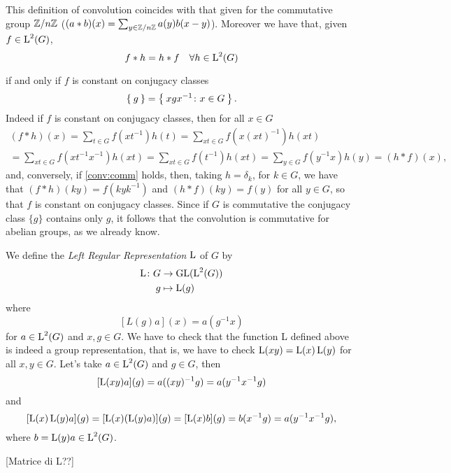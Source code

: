 \begin{rem}
This definition of convolution coincides with that given for the commutative group ${\mathbb Z}/{n{\mathbb Z}}$ ($(a\ast b)(x)=\sum_{y \in {\mathbb Z}/{n{\mathbb Z}}} a(y)b(x-y)$). 
Moreover we have that, given $f\in \operatorname{L}^2(G)$,
\begin{equation}
\label{conv:comm}
f*h=h*f \quad \forall h \in \operatorname{L}^2(G)
\end{equation}

if and only if $f$ is constant on conjugacy classes
\[
\Set{g}=\Set{xgx^{-1}\colon x\in G}.
\]
Indeed if $f$ is constant on conjugacy classes, then for all $x\in G$
\begin{multline*}
(f\ast h)(x) =\sum_{t \in G} f(xt^{-1})h(t)=\sum_{xt \in G} f(x(xt)^{-1})h(xt)\\
=\sum_{xt \in G} f(xt^{-1}x^{-1})h(xt)
=\sum_{xt \in G} f(t^{-1})h(xt)
=\sum_{y \in G} f(y^{-1}x)h(y)= (h*f)(x),
\end{multline*}
and, conversely, if \ref{conv:comm} holds, then, taking $h=\delta_k$, for $k\in G$, we have that $(f\ast h)(ky)=f(kyk^{-1})$ and $(h*f)(ky)=f(y)$ for all $y \in G$, so that $f$ is constant on conjugacy classes.
Since if $G$ is commutative the conjugacy class $\{g\}$ contains only $g$, it follows that the convolution is commutative for abelian groups, as we already know.
\end{rem}
\begin{exmp}
We define the \emph{Left Regular Representation} $\operatorname{L}$ of $G$ by 
\begin{align*}
\operatorname{L}\colon G &\rightarrow \operatorname{GL}(\operatorname{L}^2(G))\\
		 g&\mapsto \operatorname{L}(g) 
\end{align*}
where 
\[
[L(g)a](x)=a(g^{-1}x)
\]
for $a \in \operatorname{L}^2(G)$ and $x,g \in G$.
We have to check that the function L defined above is indeed a group representation, that is, we have to check $\operatorname{L}(xy)=\operatorname{L}(x)\operatorname{L}(y)$ for all $x,y \in G$. Let's take $a \in \operatorname{L}^2(G)$ and $g\in G$, then
\[ [\operatorname{L}(xy)a](g)=a((xy)^{-1}g)=a(y^{-1}x^{-1}g)
\]
and
\[
[\operatorname{L}(x)\operatorname{L}(y)a](g)=[\operatorname{L}(x)(\operatorname{L}(y)a)](g)=[\operatorname{L}(x)b](g)=b(x^{-1}g)=a(y^{-1}x^{-1}g),
\]
where $b=\operatorname{L}(y)a \in \operatorname{L}^2(G)$.

[Matrice di L??]
\end{exmp}

